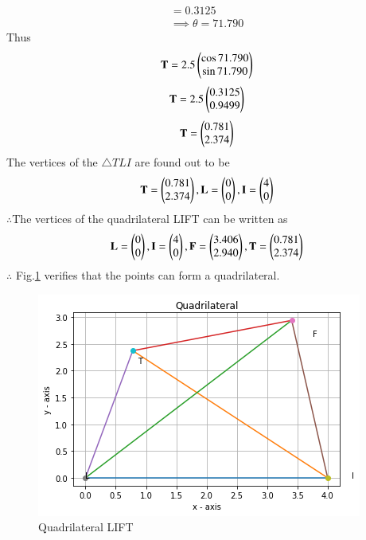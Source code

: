 \documentclass[journal,12pt,twocolumn]{IEEEtran}
\begin{document}
\begin{align}
    =0.3125
\\
    \implies \theta=71.790
\end{align}
Thus
\begin{align}
   \mathbf{T}=2.5\begin{pmatrix}\cos71.790\\\sin71.790\end{pmatrix} 
\end{align}
\begin{align}
    \mathbf{T}=2.5\begin{pmatrix}0.3125\\0.9499\end{pmatrix} 
\end{align}
\begin{align}
    \mathbf{T}=\begin{pmatrix}0.781\\2.374\end{pmatrix} 
\end{align}
The vertices of the $\triangle TLI$ are found out to be
\begin{align}
    \mathbf{T}=\begin{pmatrix}0.781\\2.374\end{pmatrix}, \mathbf{L}=\begin{pmatrix}0\\0\end{pmatrix}, \mathbf{I}=\begin{pmatrix}4\\0\end{pmatrix}
\end{align}
$\therefore$The vertices of the quadrilateral LIFT can be written as
\begin{align}
   \mathbf{L}=\begin{pmatrix}0\\0\end{pmatrix}, \mathbf{I}=\begin{pmatrix}4\\0\end{pmatrix},\mathbf{F}=\begin{pmatrix}3.406\\2.940\end{pmatrix}, \mathbf{T}=\begin{pmatrix}0.781\\2.374\end{pmatrix}
\end{align}
$\therefore$ Fig.\ref{Graphical solution}  verifies that the points can form a quadrilateral.
\begin{figure}[ht]
    \centering
    \includegraphics[width=\columnwidth]{quadrilateral.png}
    \caption{Quadrilateral LIFT}
    \label{Graphical solution}
\end{figure}
\end{document}
